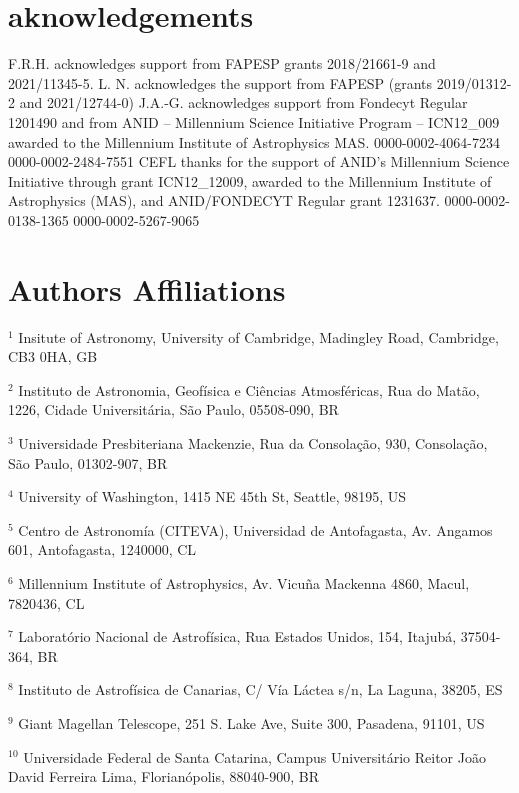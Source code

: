 \section*{aknowledgements}
F.R.H. acknowledges support from FAPESP grants 2018/21661-9 and 2021/11345-5.
L. N. acknowledges the support from FAPESP (grants 2019/01312-2 and 2021/12744-0)
J.A.-G. acknowledges support from Fondecyt Regular 1201490 and from ANID – Millennium Science Initiative Program – ICN12_009 awarded to the Millennium Institute of Astrophysics MAS.
0000-0002-4064-7234
0000-0002-2484-7551
CEFL thanks for the support of ANID's Millennium Science Initiative through grant ICN12_12009, awarded to the Millennium Institute of Astrophysics (MAS), and ANID/FONDECYT Regular grant 1231637.
0000-0002-0138-1365
0000-0002-5267-9065


\section{Authors Affiliations}\label{ap:affiliations}

\noindent
$^{1}$ Insitute of Astronomy, University of Cambridge, Madingley Road, Cambridge, CB3 0HA, GB

\noindent
$^{2}$ Instituto de Astronomia, Geofísica e Ciências Atmosféricas, Rua do Matão, 1226, Cidade Universitária, São Paulo, 05508-090, BR

\noindent
$^{3}$ Universidade Presbiteriana Mackenzie, Rua da Consolação, 930, Consolação, São Paulo, 01302-907, BR

\noindent
$^{4}$ University of Washington, 1415 NE 45th St, Seattle, 98195, US

\noindent
$^{5}$ Centro de Astronomía (CITEVA), Universidad de Antofagasta, Av. Angamos 601, Antofagasta, 1240000, CL

\noindent
$^{6}$ Millennium Institute of Astrophysics, Av. Vicuña Mackenna 4860, Macul, 7820436, CL

\noindent
$^{7}$ Laboratório Nacional de Astrofísica, Rua Estados Unidos, 154, Itajubá, 37504-364, BR

\noindent
$^{8}$ Instituto de Astrofísica de Canarias, C/ Vía Láctea s/n, La Laguna, 38205, ES

\noindent
$^{9}$ Giant Magellan Telescope, 251 S. Lake Ave, Suite 300, Pasadena, 91101, US

\noindent
$^{10}$ Universidade Federal de Santa Catarina, Campus Universitário Reitor João David Ferreira Lima, Florianópolis, 88040-900, BR

